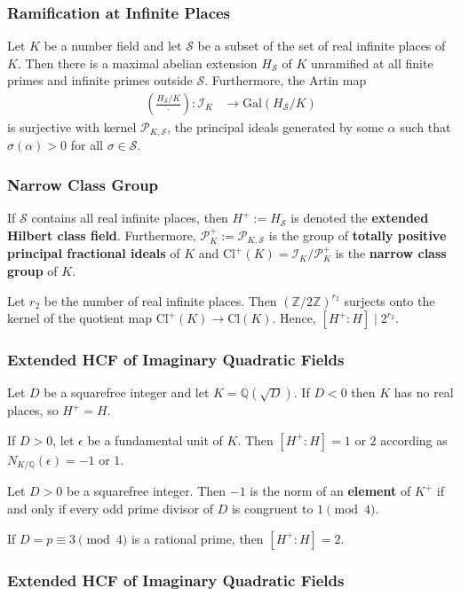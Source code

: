 \documentclass{beamer}
\newcommand{\Gal}{\mathrm{Gal}}
\newcommand{\Cl}{\mathrm{Cl}}
\newcommand{\QQ}{\mathbb{Q}}
\newcommand{\ZZ}{\mathbb{Z}}
\theoremstyle{plain}
\begin{document}
\begin{frame}
    \frametitle{Ramification at Infinite Places}
    \begin{theorem}
        Let $K$ be a number field and let $\mathcal{S}$ be a subset of the set of real infinite places of $K$. Then there is a maximal abelian extension $H_\mathcal{S}$ of $K$ unramified at all finite primes and infinite primes outside $\mathcal{S}$. Furthermore, the Artin map
        \begin{align*}
            \left(\frac{H_\mathcal{S}/K}{\cdot}\right):\mathcal{I}_{K}&\longrightarrow\Gal(H_\mathcal{S}/K)
        \end{align*}
        is surjective with kernel $\mathcal{P}_{K,\mathcal{S}}$, the principal ideals generated by some $\alpha$ such that $\sigma(\alpha)>0$ for all $\sigma\in\mathcal{S}$.
    \end{theorem}
\end{frame}

\begin{frame}
    \frametitle{Narrow Class Group}
    \begin{definition}
        If $\mathcal{S}$ contains all real infinite places, then $H^+:=H_\mathcal{S}$ is denoted the \textbf{extended Hilbert class field}. Furthermore, $\mathcal{P}_K^+:=\mathcal{P}_{K,\mathcal{S}}$ is the group of \textbf{totally positive principal fractional ideals} of $K$ and $\Cl^+(K)=\mathcal{I}_K/\mathcal{P}^+_K$ is the \textbf{narrow class group} of $K$.
    \end{definition}

    \begin{lemma}
        Let $r_2$ be the number of real infinite places. Then $(\ZZ/2\ZZ)^{r_2}$ surjects onto the kernel of the quotient map $\Cl^+(K)\to\Cl(K)$. Hence, $[H^+:H]\mid 2^{r_2}$.        
    \end{lemma}        
\end{frame}

\begin{frame}
    \frametitle{Extended HCF of Imaginary Quadratic Fields}
    Let $D$ be a squarefree integer and let $K=\QQ(\sqrt{D})$. If $D<0$ then $K$ has no real places, so $H^+=H$.
    \begin{theorem}
        If $D>0$, let $\epsilon$ be a fundamental unit of $K$. Then $[H^+:H]=1$ or $2$ according as $N_{K/\QQ}(\epsilon)=-1$ or $1$.
    \end{theorem}
    \begin{lemma}
        Let $D>0$ be a squarefree integer. Then $-1$ is the norm of an \textbf{element} of $K^+$ if and only if every odd prime divisor of $D$ is congruent to $1\pmod{4}$.
    \end{lemma}
    \begin{corollary}
        If $D=p\equiv3\pmod{4}$ is a rational prime, then $[H^+:H]=2$. 
    \end{corollary}
\end{frame}

\begin{frame}
    \frametitle{Extended HCF of Imaginary Quadratic Fields}

\end{frame}
\end{document}
